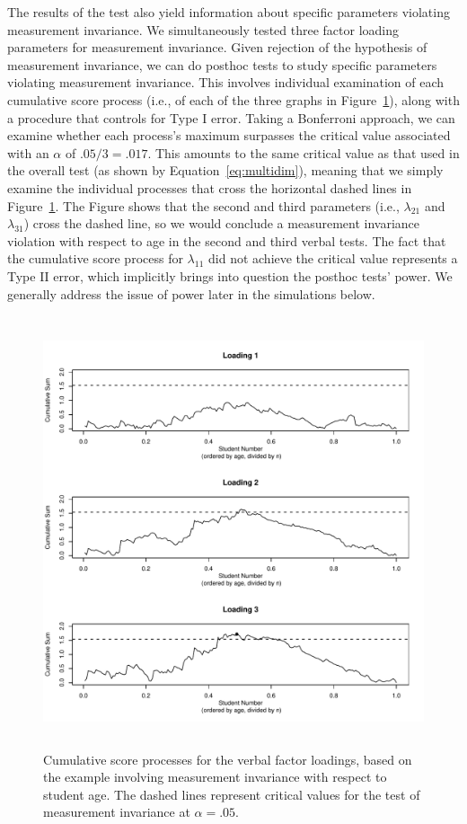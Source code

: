 \documentclass[man]{apa}
\begin{document}
The results of the test also yield information about specific
parameters violating measurement invariance.  We simultaneously tested
three factor loading parameters for measurement invariance.  Given
rejection of the hypothesis of measurement invariance, we can 
do posthoc 
tests to study specific parameters violating measurement invariance.
This involves individual examination of each cumulative score process
(i.e., of each of the three graphs in Figure~\ref{fig:cusumex}),
along with a procedure that controls for Type I error.  Taking a
Bonferroni approach, we can examine whether each process's maximum
surpasses the critical value associated with an $\alpha$ of
$.05/3=.017$.  This amounts to the same critical value as that used in
the overall test (as shown by Equation~\eqref{eq:multidim}),
meaning that we simply examine the individual processes that cross
the horizontal dashed lines in Figure~\ref{fig:cusumex}.  The Figure
shows that the second and third parameters (i.e., $\lambda_{21}$ and
$\lambda_{31}$) cross the dashed line, so we would conclude a measurement
invariance violation with respect to age in the second and third
verbal tests.  The fact that the cumulative score process for
$\lambda_{11}$ did not achieve the critical value represents a Type II
error, which implicitly brings into question the posthoc tests' power.  We
generally address the issue of power later in the simulations below.

\begin{figure}
\caption{Cumulative score processes for the verbal factor loadings,
  based on the example involving measurement invariance with respect
  to student age.  The dashed lines represent critical values for the
  test of measurement invariance at $\alpha=.05$.}
\label{fig:cusumex}
\includegraphics[height=5in]{example.pdf}
\end{figure}
\end{document}
